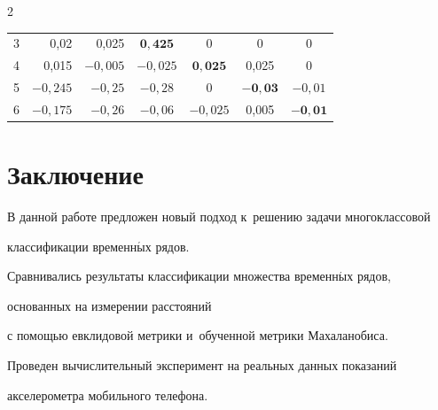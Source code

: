 \begin{multicols}{2}
\begin{table}
\begin{center}
\begin{tabular}{|c|r|r|c|c|c|c|}


3 & 0,02\hphantom{9,}   & 0,025\hphantom{,}  & \hphantom{9,}$\mathbf{0{,}425}$  & 0  & 0\hphantom{,999} & 0\hphantom{9}\\ 




4 & 0,015\hphantom{,}  & $-0{,}005$\hphantom{,} & $-0{,}025$ & \hphantom{9.9.9}$\mathbf{0{,}025}$ & 0,025 & 0\hphantom{9}\\ 




5 & $-0{,}245$\hphantom{,} & $-0{,}25$\hphantom{9,}  & $-0{,}28$\hphantom{9}  & 0 & $\mathbf{-0{,}03}$\hphantom{99} & $-0{,}01$ \\ 




6 & $-0{,}175$\hphantom{,} & $-0{,}26$\hphantom{9,}  & $-0{,}06$\hphantom{9}  & \hphantom{$-$,}$-0{,}025$ & 0,005 & $\mathbf{-0{,}01}$ \\ 


\hline


\end{tabular}


\end{center}


\end{table}





\vspace*{-6pt}





\section{Заключение}





В данной работе предложен новый подход к~решению задачи многоклассовой 


классификации временн$\acute{\mbox{ы}}$х рядов.


Сравнивались результаты классификации множества временн$\acute{\mbox{ы}}$х рядов, 


основанных на измерении расстояний


с помощью евклидовой метрики и~обученной метрики Махаланобиса.


Проведен вычислительный эксперимент на реальных данных показаний 


акселерометра мобильного телефона.



\end{multicols}
